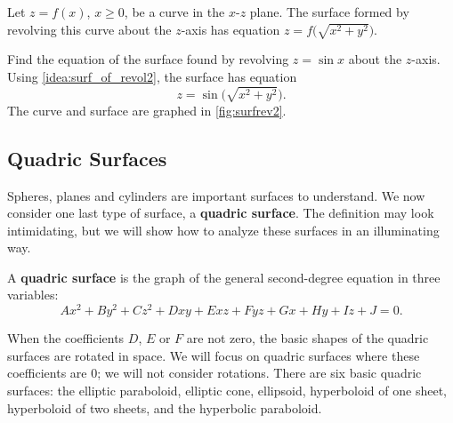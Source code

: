 \begin{keyidea}\label{idea:surf_of_revol2}%
Let $z=f(x)$, $x\geq 0$, be a curve in the $x$-$z$ plane. The surface formed by revolving this curve about the $z$-axis has equation $z=f\bigl(\sqrt{x^2+y^2}\bigr)$.
\end{keyidea}

%
\begin{example}\label{ex_surfrev2}%
Find the equation of the surface found by revolving $z=\sin x$ about the $z$-axis.
\solution
Using \autoref{idea:surf_of_revol2}, the surface has equation \[z=\sin\bigl(\sqrt{x^2+y^2}\bigr).\]
The curve and surface are graphed in \autoref{fig:surfrev2}.
\end{example}

\subsection{Quadric Surfaces}

Spheres, planes and cylinders are important surfaces to understand. We now consider one last type of surface, a \textbf{quadric surface}. The definition may look intimidating, but we will show how to analyze these surfaces in an illuminating way.

\begin{definition}\label{def:quadric}%
A \textbf{quadric surface} is the graph of the general second-degree equation in three variables:
\[Ax^2+By^2+Cz^2+Dxy+Exz+Fyz+Gx+Hy+Iz+J=0.\]
\end{definition}

When the coefficients $D$, $E$ or $F$ are not zero, the basic shapes of the quadric surfaces are rotated in space. We will focus on quadric surfaces where these coefficients are 0; we will not consider rotations. There are six basic quadric surfaces: the elliptic paraboloid, elliptic cone, ellipsoid, hyperboloid of one sheet, hyperboloid of two sheets, and the hyperbolic paraboloid.

